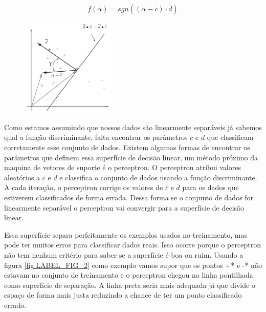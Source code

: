 \begin{equation}
f(\bar{\alpha})=sgn((\bar{\alpha}-\bar{c})\cdot\bar{d})
    \label{eq:LABEL_EQ_1}
\end{equation}

\begin{figure}
  \centering
  \includegraphics[width=0.4\textwidth]{imagens/svm_1.png}
  \label{fig:LABEL_FIG_1}
\end{figure}

Como estamos assumindo que nossos dados são linearmente separáveis já sabemos qual a função discriminante, falta encontrar os parâmetros $\bar{c}$ e $\bar{d}$ que classificam corretamente esse conjunto de dados. Existem algumas formas de encontrar os parâmetros que definem essa superfície de decisão linear, um método próximo da maquina de vetores de suporte é o perceptron. O perceptron atribui valores aleatórios a $\bar{c}$ e $\bar{d}$ e classifica o conjunto de dados usando a função discriminante. A cada iteração, o perceptron corrige os valores de $\bar{c}$ e $\bar{d}$ para os dados que estiverem classificados de forma errada. Dessa forma se o conjunto de dados for linearmente separável o perceptron vai convergir para a superfície de decisão linear.

Essa superfície separa perfeitamente os exemplos usados no treinamento, mas pode ter muitos erros para classificar dados reais. Isso ocorre porque o perceptron não tem nenhum critério para saber se a superfície é boa ou ruim. Usando a figura \ref{fig:LABEL_FIG_2} como exemplo vamos supor que os pontos +* e -* não estavam no conjunto de treinamento e o perceptron chegou na linha pontilhada como superfície de separação. A linha preta seria mais adequada já que divide o espaço de forma mais justa reduzindo a chance de ter um ponto classificado errado.

